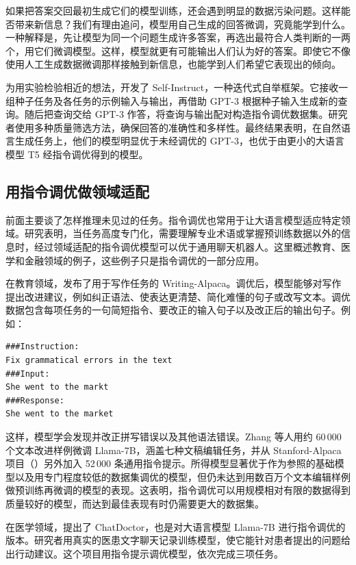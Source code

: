 如果把答案交回最初生成它们的模型训练，还会遇到明显的数据污染问题。这样能否带来新信息？我们有理由追问，模型用自己生成的回答微调，究竟能学到什么。一种解释是，先让模型为同一个问题生成许多答案，再选出最符合人类判断的一两个，用它们微调模型。这样，模型就更有可能输出人们认为好的答案。即使它不像使用人工生成数据微调那样接触到新信息，也能学到人们希望它表现出的倾向。

为用实验检验相近的想法，开发了 Self-Instruct，一种迭代式自举框架。它接收一组种子任务及各任务的示例输入与输出，再借助 GPT-3 根据种子输入生成新的查询。随后把查询交给 GPT-3 作答，将查询与输出配对构造指令调优数据集。研究者使用多种质量筛选方法，确保回答的准确性和多样性。最终结果表明，在自然语言生成任务上，他们的模型明显优于未经调优的 GPT-3，也优于由更小的大语言模型 T5 经指令调优得到的模型。

\subsection{用指令调优做领域适配}
前面主要谈了怎样推理未见过的任务。指令调优也常用于让大语言模型适应特定领域。研究表明，当任务高度专门化，需要理解专业术语或掌握预训练数据以外的信息时，经过领域适配的指令调优模型可以优于通用聊天机器人。这里概述教育、医学和金融领域的例子，这些例子只是指令调优的一部分应用。

在教育领域，发布了用于写作任务的 Writing-Alpaca。调优后，模型能够对写作提出改进建议，例如纠正语法、使表达更清楚、简化难懂的句子或改写文本。调优数据包含每项任务的一句简短指令、要改正的输入句子以及改正后的输出句子。例如：

\begin{lstlisting}[nolol=true]
###Instruction:
Fix grammatical errors in the text
###Input:
She went to the markt
###Response:
She went to the market
\end{lstlisting}

这样，模型学会发现并改正拼写错误以及其他语法错误。Zhang 等人用约 60\,000 个文本改进样例微调 Llama-7B，涵盖七种文稿编辑任务，并从 Stanford-Alpaca 项目（）另外加入 52\,000 条通用指令提示。所得模型显著优于作为参照的基础模型以及用专门程度较低的数据集调优的模型，但仍未达到用数百万个文本编辑样例做预训练再微调的模型的表现。这表明，指令调优可以用规模相对有限的数据得到质量较好的模型，而达到最佳表现有时仍需要更大的数据集。

在医学领域，提出了 ChatDoctor，也是对大语言模型 Llama-7B 进行指令调优的版本。研究者用真实的医患文字聊天记录训练模型，使它能针对患者提出的问题给出行动建议。这个项目用指令提示调优模型，依次完成三项任务。

